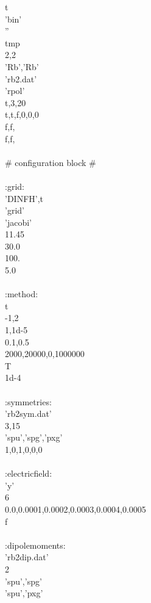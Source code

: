 \documentclass[a4paper,10pt]{article}
\begin{document}
\quote
t\\
'bin' \\
''\\
tmp\\
2,2\\
'Rb','Rb'\\
'rb2.dat'\\
'rpol'\\
t,3,20\\
t,t,f,0,0,0\\
f,f,\\
f,f,\\
\\
\# configuration block \# \\
\\
:grid:\\
'DINFH',t\\
'grid'\\
'jacobi'\\
11.45\\
30.0\\
100.\\
5.0 \\
\\
:method:\\
t\\
-1,2\\ 
1,1d-5\\
0.1,0.5\\
2000,20000,0,1000000\\
T\\
1d-4\\
\\
:symmetries:\\
'rb2sym.dat'\\
3,15\\
'spu','spg','pxg'\\
1,0,1,0,0,0\\
\\
:electricfield:\\
'y'\\
6 \\
0.0,0.0001,0.0002,0.0003,0.0004,0.0005\\
f \\
\\
:dipolemoments:\\
'rb2dip.dat'\\
2         \\ 
'spu','spg'\\
'spu','pxg'\\
\end{document}
